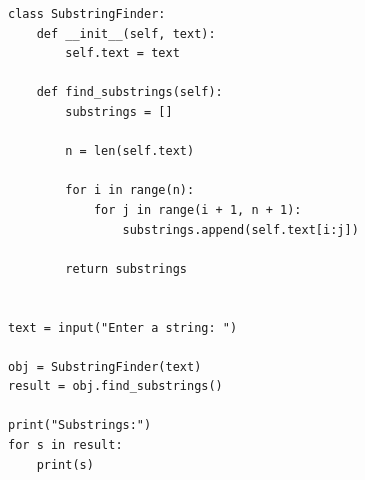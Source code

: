 \begin{verbatim}
class SubstringFinder:
    def __init__(self, text):
        self.text = text

    def find_substrings(self):
        substrings = []

        n = len(self.text)

        for i in range(n):
            for j in range(i + 1, n + 1):
                substrings.append(self.text[i:j])

        return substrings


text = input("Enter a string: ")

obj = SubstringFinder(text)
result = obj.find_substrings()

print("Substrings:")
for s in result:
    print(s)
\end{verbatim}